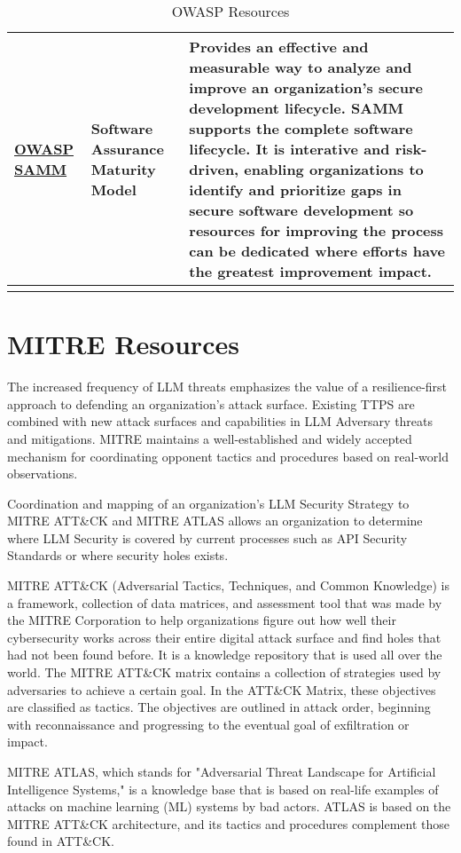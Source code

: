 \begin{longtable}[c]{|p{}|p{}|p{}|}
  \hline
  \href{https://owasp.org/www-project-samm/}{OWASP SAMM} & Software Assurance Maturity Model & Provides an effective and measurable way to analyze and improve an organization's secure development lifecycle. SAMM supports the complete software lifecycle. It is interative and risk-driven, enabling organizations to identify and prioritize gaps in secure software development so resources for improving the process can be dedicated where efforts have the greatest improvement impact. \\
  \hline
\caption{OWASP Resources}
\label{tab:owasp-resources}
\end{longtable}

\clearpage
\section{MITRE Resources}

The increased frequency of LLM threats emphasizes the value of a
resilience-first approach to defending an organization's attack surface.
Existing TTPS are combined with new attack surfaces and capabilities in LLM
Adversary threats and mitigations. MITRE maintains a well-established and
widely accepted mechanism for coordinating opponent tactics and procedures
based on real-world observations.

Coordination and mapping of an organization's LLM Security Strategy to MITRE
ATT\&CK and MITRE ATLAS allows an organization to determine where LLM Security
is covered by current processes such as API Security Standards or where
security holes exists.

MITRE ATT\&CK (Adversarial Tactics, Techniques, and Common Knowledge) is a
framework, collection of data matrices, and assessment tool that was made by
the MITRE Corporation to help organizations figure out how well their
cybersecurity works across their entire digital attack surface and find holes
that had not been found before. It is a knowledge repository that is used all
over the world. The MITRE ATT\&CK matrix contains a collection of strategies
used by adversaries to achieve a certain goal. In the ATT\&CK Matrix, these
objectives are classified as tactics. The objectives are outlined in attack
order, beginning with reconnaissance and progressing to the eventual goal of
exfiltration or impact.

MITRE ATLAS, which stands for "Adversarial Threat Landscape for Artificial
Intelligence Systems," is a knowledge base that is based on real-life examples
of attacks on machine learning (ML) systems by bad actors. ATLAS is based on the
MITRE ATT\&CK architecture, and its tactics and procedures complement those
found in ATT\&CK.

